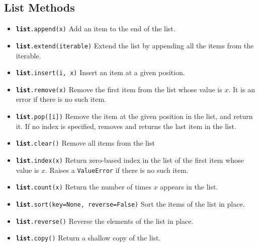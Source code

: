 \subsection{List Methods}
\begin{itemize}
\item \colorbox{CornflowerBlue!20}{\texttt{\textbf{list}.append(x)}} Add an item to the end of the list.
\item \colorbox{CornflowerBlue!20}{\texttt{\textbf{list}.extend(iterable)}} Extend the list by appending all the items from the iterable.
\item \colorbox{CornflowerBlue!20}{\texttt{\textbf{list}.insert(i, x)}} Insert an item at a given position.
\item \colorbox{CornflowerBlue!20}{\texttt{\textbf{list}.remove(x)}} Remove the first item from the list whose value is $x$. It is an error if
there is no such item.
\item \colorbox{CornflowerBlue!20}{\texttt{\textbf{list}.pop([i])}} Remove the item at the given position in the list, and return it. If no
index is specified, removes and returns the last item in the list.
\item \colorbox{CornflowerBlue!20}{\texttt{\textbf{list}.clear()}} Remove all items from the list
\item \colorbox{CornflowerBlue!20}{\texttt{\textbf{list}.index(x)}} Return zero-based index in the list of the first item whose value is $x$.
Raises a \colorbox{CornflowerBlue!20}{\texttt{ValueError}} if there is no such item.
\item \colorbox{CornflowerBlue!20}{\texttt{\textbf{list}.count(x)}} Return the number of times $x$ appears in the list.
\item \colorbox{CornflowerBlue!20}{\texttt{\textbf{list}.sort(key=None, reverse=False)}} Sort the items of the list in place.
\item \colorbox{CornflowerBlue!20}{\texttt{\textbf{list}.reverse()}} Reverse the elements of the list in place.
\item \colorbox{CornflowerBlue!20}{\texttt{\textbf{list}.copy()}} Return a shallow copy of the list.
\end{itemize}

